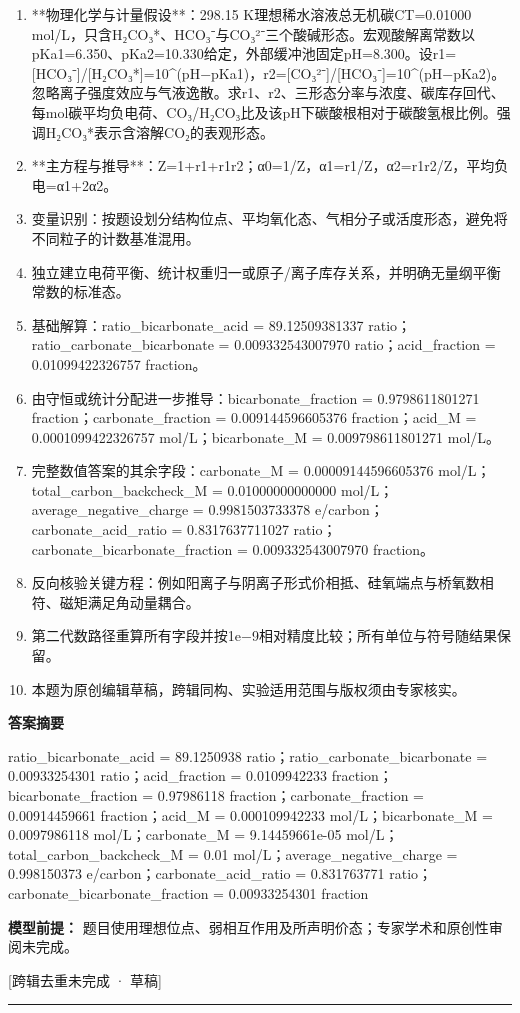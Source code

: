\documentclass[UTF8,11pt,a4paper]{ctexart}
\begin{document}
\begin{enumerate}
\item **物理化学与计量假设**：298.15 K理想稀水溶液总无机碳CT=0.01000 mol/L，只含H₂CO₃*、HCO₃⁻与CO₃²⁻三个酸碱形态。宏观酸解离常数以pKa1=6.350、pKa2=10.330给定，外部缓冲池固定pH=8.300。设r1=[HCO₃⁻]/[H₂CO₃*]=10\textasciicircum{}(pH−pKa1)，r2=[CO₃²⁻]/[HCO₃⁻]=10\textasciicircum{}(pH−pKa2)。忽略离子强度效应与气液逸散。求r1、r2、三形态分率与浓度、碳库存回代、每mol碳平均负电荷、CO₃/H₂CO₃比及该pH下碳酸根相对于碳酸氢根比例。强调H₂CO₃*表示含溶解CO₂的表观形态。
\item **主方程与推导**：Z=1+r1+r1r2；α0=1/Z，α1=r1/Z，α2=r1r2/Z，平均负电=α1+2α2。
\item 变量识别：按题设划分结构位点、平均氧化态、气相分子或活度形态，避免将不同粒子的计数基准混用。
\item 独立建立电荷平衡、统计权重归一或原子/离子库存关系，并明确无量纲平衡常数的标准态。
\item 基础解算：ratio\_bicarbonate\_acid = 89.12509381337 ratio；ratio\_carbonate\_bicarbonate = 0.009332543007970 ratio；acid\_fraction = 0.01099422326757 fraction。
\item 由守恒或统计分配进一步推导：bicarbonate\_fraction = 0.9798611801271 fraction；carbonate\_fraction = 0.009144596605376 fraction；acid\_M = 0.0001099422326757 mol/L；bicarbonate\_M = 0.009798611801271 mol/L。
\item 完整数值答案的其余字段：carbonate\_M = 0.00009144596605376 mol/L；total\_carbon\_backcheck\_M = 0.01000000000000 mol/L；average\_negative\_charge = 0.9981503733378 e/carbon；carbonate\_acid\_ratio = 0.8317637711027 ratio；carbonate\_bicarbonate\_fraction = 0.009332543007970 fraction。
\item 反向核验关键方程：例如阳离子与阴离子形式价相抵、硅氧端点与桥氧数相符、磁矩满足角动量耦合。
\item 第二代数路径重算所有字段并按1e−9相对精度比较；所有单位与符号随结果保留。
\item 本题为原创编辑草稿，跨辑同构、实验适用范围与版权须由专家核实。
\end{enumerate}
\noindent\textbf{答案摘要}\par
ratio\_bicarbonate\_acid = 89.1250938 ratio；ratio\_carbonate\_bicarbonate = 0.00933254301 ratio；acid\_fraction = 0.0109942233 fraction；bicarbonate\_fraction = 0.97986118 fraction；carbonate\_fraction = 0.00914459661 fraction；acid\_M = 0.000109942233 mol/L；bicarbonate\_M = 0.0097986118 mol/L；carbonate\_M = 9.14459661e-05 mol/L；total\_carbon\_backcheck\_M = 0.01 mol/L；average\_negative\_charge = 0.998150373 e/carbon；carbonate\_acid\_ratio = 0.831763771 ratio；carbonate\_bicarbonate\_fraction = 0.00933254301 fraction\par
\noindent\textbf{模型前提：}
题目使用理想位点、弱相互作用及所声明价态；专家学术和原创性审阅未完成。\par
\noindent\textcolor{red!65!black}{[跨辑去重未完成 · 草稿]} \par
\medskip\hrule\medskip
{}
\end{document}
